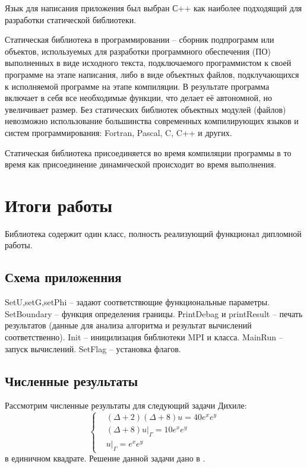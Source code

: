 Язык для написания приложения был выбран С++ как наиболее подходящий для разработки статической библиотеки.

Статическая библиотека в программировании -- сборник подпрограмм или объектов, используемых для разработки программного обеспечения (ПО) выполненных в виде исходного текста, подключаемого программистом к своей программе на этапе написания, либо в виде объектных файлов, подклучающихся к исполняемой программе на этапе компиляции. В результате программа включает в себя все необходимые функции, что делает её автономной, но увеличивает размер. Без статических библиотек объектных модулей (файлов) невозможно использование большинства современных компилирующих языков и систем программирования: Fortran, Pascal, C, C++ и других.

Статическая библиотека присоединяется во время компиляции программы в то время как присоединение динамической происходит во время выполнения.

\chapter{Итоги работы}
Библиотека содержит один класс, полность реализующий функционал дипломной работы.  
\section{Схема приложенния}
\begin{spacing}{0.9}

\end{spacing}
SetU,setG,setPhi -- задают соответствющие функциональные параметры.
SetBoundary -- функция определения границы.
РrintDebag и printResult -- печать результатов (данные для анализа алгоритма и результат вычислений соответственно).
Init -- иницилизация библиотеки MPI и класса.
MainRun -- запуск вычислений.
SetFlag -- установка флагов.
\section{Численные результаты}
Рассмотрим численные результаты для следующий задачи Дихиле:
\begin{equation} 
	\left\{
\begin{aligned}
& (\Delta + 2) (\Delta +8) u = 40e^{x}e^{y}\\ & (\Delta +8) u|_{\Gamma} = 10e^{x}e^{y}\\&u|_{\Gamma} = e^{x}e^{y}
\end{aligned}
 \right. \end{equation}
{}
в единичном квадрате. Решение данной задачи дано в \cite{luk:dis}.

